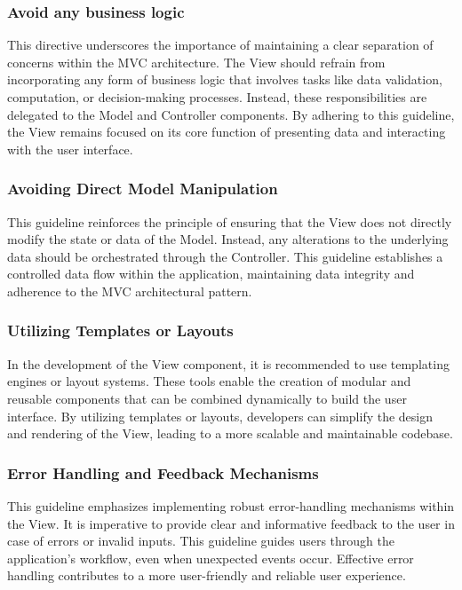 \subsubsection{Avoid any business logic}
This directive underscores the importance of maintaining a clear separation of concerns within the MVC architecture. The View should refrain from incorporating any form of business logic that involves tasks like data validation, computation, or decision-making processes. Instead, these responsibilities are delegated to the Model and Controller components. By adhering to this guideline, the View remains focused on its core function of presenting data and interacting with the user interface.

\subsubsection{Avoiding Direct Model Manipulation}
This guideline reinforces the principle of ensuring that the View does not directly modify the state or data of the Model. Instead, any alterations to the underlying data should be orchestrated through the Controller. This guideline establishes a controlled data flow within the application, maintaining data integrity and adherence to the MVC architectural pattern.

\subsubsection{Utilizing Templates or Layouts}
In the development of the View component, it is recommended to use templating engines or layout systems. These tools enable the creation of modular and reusable components that can be combined dynamically to build the user interface. By utilizing templates or layouts, developers can simplify the design and rendering of the View, leading to a more scalable and maintainable codebase.

\subsubsection{Error Handling and Feedback Mechanisms}
This guideline emphasizes implementing robust error-handling mechanisms within the View. It is imperative to provide clear and informative feedback to the user in case of errors or invalid inputs. This guideline guides users through the application's workflow, even when unexpected events occur. Effective error handling contributes to a more user-friendly and reliable user experience.

